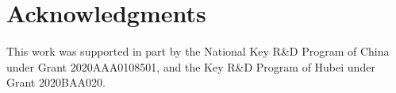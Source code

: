 \section*{Acknowledgments}
This work was supported in part by the National Key R\&D Program of China under Grant 2020AAA0108501, and the Key R\&D Program of Hubei under Grant 2020BAA020.